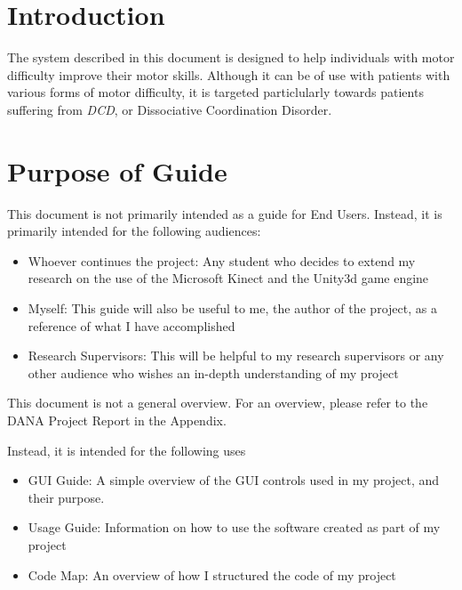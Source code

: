 \documentclass{report}
\begin{document}


\tableofcontents

\newpage

\section{Introduction}
The system described in this document is designed to help individuals with motor
difficulty improve their motor skills. Although it can be of use with patients
with various forms of motor difficulty, it is targeted particlularly towards
patients suffering from \textit{DCD}, or Dissociative Coordination Disorder. 

\section{Purpose of Guide} 
This document is not primarily intended as a guide for End Users. Instead, it is primarily intended for the following audiences:

\begin{itemize}
	\item Whoever continues the project: Any student who decides to extend my research on the use of the Microsoft Kinect and the Unity3d game engine

	\item Myself: This guide will also be useful to me, the author of the project, as a reference of what I have accomplished

	\item Research Supervisors: This will be helpful to my research supervisors or any other audience who wishes an in-depth understanding of my project
\end{itemize}

This document is not a general overview. For an overview, please refer to the DANA Project Report in the Appendix.

Instead, it is intended for the following uses
\begin{itemize}
	\item GUI Guide: A simple overview of the GUI controls used in my project, and their purpose.

	\item Usage Guide: Information on how to use the software created as part of my project

	\item Code Map: An overview of how I structured the code of my project

\end{itemize}
\end{document}
